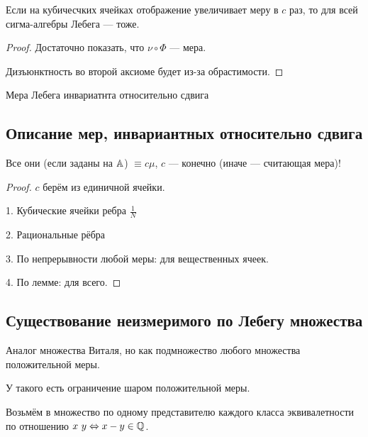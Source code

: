 \documentclass[12pt, a4paper, oneside]{memoir}
\begin{document}
\begin{corollary}
        Если на кубичесчких ячейках отображение увеличивает меру в $c$ раз,
        то для всей сигма-алгебры Лебега — тоже.

        \begin{proof}
            Достаточно показать, что $\nu \circ \Phi$ — мера.

            Дизъюнктность во второй аксиоме будет из-за обрастимости.
        \end{proof}
\end{corollary}

\begin{corollary}
    Мера Лебега инвариатнта относительно сдвига
\end{corollary}



\subsection{Описание мер, инвариантных относительно сдвига}

\begin{theorem}

    Все они (если заданы на ${\mathbb{A}}$) $\equiv c \mu$, $c$ — конечно (иначе — считающая мера)!

    \begin{proof}
        $c$ берём из единичной ячейки.

        1. Кубические ячейки ребра $\frac{1}{N}$

        2. Рациональные рёбра
        
        3. По непрерывности любой меры: для вещественных ячеек.

        4. По лемме: для всего.
    \end{proof}
\end{theorem}


\subsection{Существование неизмеримого по Лебегу множества}

Аналог множества Виталя, но как подмножество любого множества положительной меры.

У такого есть ограничение шаром положительной меры.

Возьмём в множество по одному представителю каждого 
класса эквивалетности по отношению $x ~ y \Leftrightarrow x - y \in {\mathbb{Q}}$.
\end{document}
